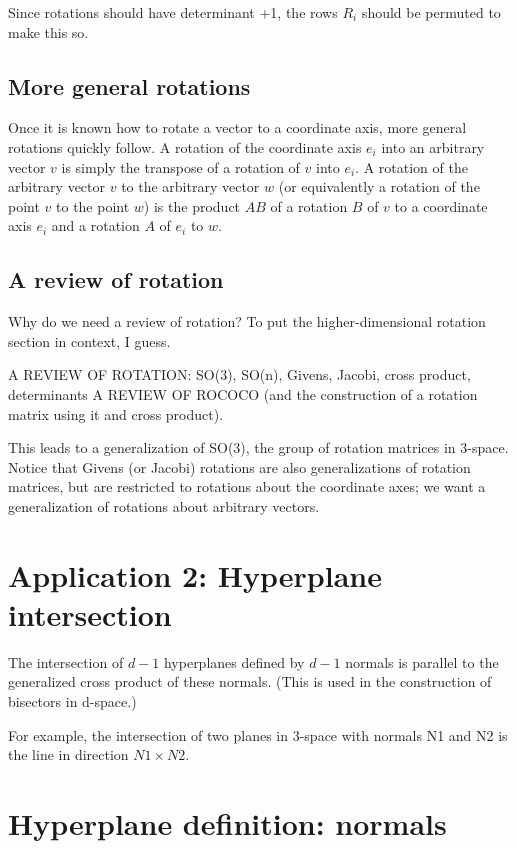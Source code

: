 \documentclass[10pt]{article}
\begin{document}
Since rotations should have determinant +1, %
the rows $R_i$ should be permuted to make this so.

\subsection{More general rotations}

Once it is known how to rotate a vector to a coordinate axis, more general
rotations quickly follow.
A rotation of the coordinate axis $e_i$ into an arbitrary vector $v$
is simply the transpose of a rotation of $v$ into $e_i$.
A rotation of the arbitrary vector $v$ to the arbitrary vector $w$ 
(or equivalently a rotation of the point $v$ to the point $w$)
is the product $AB$ of a rotation $B$ of $v$ to a coordinate axis $e_i$ 
and a rotation $A$ of $e_i$ to $w$.

\subsection{A review of rotation}
Why do we need a review of rotation?  To put the higher-dimensional rotation section in context, I guess.

A REVIEW OF ROTATION: SO(3), SO(n), Givens, Jacobi, cross product, determinants
A REVIEW OF ROCOCO (and the construction of a rotation matrix using it 
and cross product).

This leads to a generalization of SO(3), the group of rotation matrices in 3-space.
Notice that Givens (or Jacobi) rotations \cite{golubvanLoan} are also 
generalizations
of rotation matrices, but are restricted to rotations about the coordinate axes;
we want a generalization of rotations about arbitrary vectors.

\section{Application 2: Hyperplane intersection}

The intersection of $d-1$ hyperplanes defined by $d-1$ normals is parallel 
to the generalized cross product of these normals.
(This is used in the construction of bisectors in d-space.)

For example, the intersection of two planes in 3-space with normals N1 and N2 
is the line in direction $N1 \times N2$.


\section{Hyperplane definition: normals}
\end{document}
